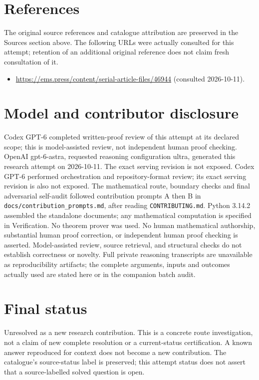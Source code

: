 \documentclass[11pt]{article}
\begin{document}
\section{References}
The original source references and catalogue attribution are preserved in the
Sources section above. The following URLs were actually consulted for this attempt;
retention of an additional original reference does not claim fresh consultation of it.
\begin{itemize}
\item \url{https://ems.press/content/serial-article-files/46944} (consulted 2026-10-11). 
\end{itemize}
\section{Model and contributor disclosure}
Codex GPT-6 completed written-proof review of this attempt at its declared scope; this is model-assisted review, not independent human proof checking.
OpenAI gpt-6-astra, requested reasoning configuration ultra, generated this research
attempt on 2026-10-11. The exact serving revision is not exposed. Codex GPT-6
performed orchestration and repository-format review; its exact serving revision
is also not exposed. The mathematical route, boundary checks and final adversarial
self-audit followed contribution prompts A then B in
\texttt{docs/contribution\_prompts.md}, after reading \texttt{CONTRIBUTING.md}.
Python 3.14.2 assembled the standalone documents; any mathematical computation is
specified in Verification. No theorem prover was used. No human mathematical
authorship, substantial human proof correction, or independent human proof checking
is asserted. Model-assisted review, source retrieval, and structural checks do not
establish correctness or novelty. Full private reasoning transcripts are unavailable
as reproducibility artifacts; the complete arguments, inputs and outcomes actually
used are stated here or in the companion batch audit.
\section{Final status}
Unresolved as a new research contribution. This is a concrete route investigation,
not a claim of new complete resolution or a current-status certification. A known
answer reproduced for context does not become a new contribution. The catalogue's
source-status label is preserved; this attempt status does not assert that a
source-labelled solved question is open.
\end{document}
